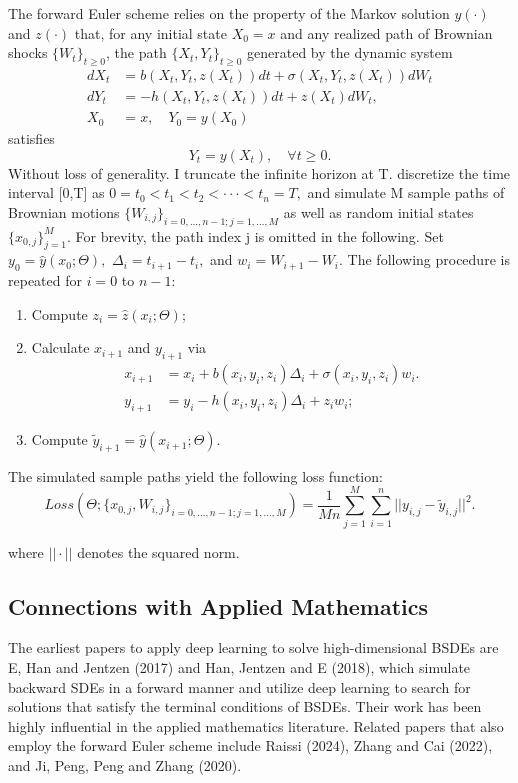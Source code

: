 \documentclass{article}
\begin{document}
The forward Euler scheme relies on the property of the Markov solution $y(\cdot)$ and $z(\cdot)$ that, for any initial state $X_{0}=x$ and any realized path of Brownian shocks $\{W_{t}\}_{t\ge0}$, the path $\{X_{t},Y_{t}\}_{t\ge0}$ generated by the dynamic system
\begin{align*}
dX_{t}&=b(X_{t},Y_{t},z(X_{t}))dt+\sigma(X_{t},Y_{t},z(X_{t}))dW_{t} \\
dY_{t}&=-h(X_{t},Y_{t},z(X_{t}))dt+z(X_{t})dW_{t}, \\
X_{0}&=x, \quad Y_{0}=y(X_{0})
\end{align*}
satisfies
\[
Y_{t}=y(X_{t}), \quad \forall t\ge0.
\]
Without loss of generality. I truncate the infinite horizon at T. discretize the time interval [0,T] as $0=t_{0}<t_{1}<t_{2}<\cdot\cdot\cdot<t_{n}=T,$ and simulate M sample paths of Brownian motions $\{W_{i,j}\}_{i=0,...,n-1;j=1,...,M}$ as well as random initial states $\{x_{0,j}\}_{j=1}^{M}$. For brevity, the path index j is omitted in the following. Set $y_{0}=\hat{y}(x_{0};\Theta),$ $\Delta_{i}=t_{i+1}-t_{i},$ and $w_{i}=W_{i+1}-W_{i}.$ The following procedure is repeated for $i=0$ to $n-1$:
\begin{enumerate}[label=\arabic*.]
    \item Compute $z_{i}=\hat{z}(x_{i};\Theta)$;
    \item Calculate $x_{i+1}$ and $y_{i+1}$ via
    \begin{align*}
    x_{i+1}&=x_{i}+b(x_{i},y_{i},z_{i})\Delta_{i}+\sigma(x_{i},y_{i},z_{i})w_{i}. \\
    y_{i+1}&=y_{i}-h(x_{i},y_{i},z_{i})\Delta_{i}+z_{i}w_{i};
    \end{align*}
    \item Compute $\tilde{y}_{i+1}=\hat{y}(x_{i+1};\Theta)$.
\end{enumerate}
The simulated sample paths yield the following loss function:
\[
Loss(\Theta;\{x_{0,j},W_{i,j}\}_{i=0,...,n-1;j=1,...,M})=\frac{1}{Mn}\sum_{j=1}^{M}\sum_{i=1}^{n}||y_{i,j}-\tilde{y}_{i,j}||^{2}.
\]

\clearpage

where $||\cdot||$ denotes the squared norm.

\subsection{Connections with Applied Mathematics}

The earliest papers to apply deep learning to solve high-dimensional BSDEs are E, Han and Jentzen (2017) and Han, Jentzen and E (2018), which simulate backward SDEs in a forward manner and utilize deep learning to search for solutions that satisfy the terminal conditions of BSDEs. Their work has been highly influential in the applied mathematics literature. Related papers that also employ the forward Euler scheme include Raissi (2024), Zhang and Cai (2022), and Ji, Peng, Peng and Zhang (2020).
\end{document}

